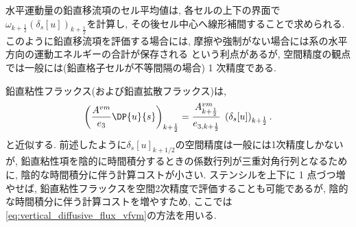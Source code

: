 水平運動量の鉛直移流項のセル平均値は, 各セルの上下の界面で 
$\omega_{k+\frac{1}{2}} (\delta_s[u])_{k+\frac{1}{2}}$を計算し,
その後セル中心へ線形補間することで求められる. このように鉛直移流項を評価する場合には, 
摩擦や強制がない場合には系の水平方向の運動エネルギーの合計が保存される\citep{arakawa1977computational}
という利点があるが, 空間精度の観点では一般には(鉛直格子セルが不等間隔の場合) 1 次精度である.

鉛直粘性フラックス(および鉛直拡散フラックス)は,   
\begin{equation*}
 \left(\dfrac{A^{vm}}{e_3} \DP{u}{s} \right)_{k+\frac{1}{2}}
  =\dfrac{A^{vm}_{k+\frac{1}{2}}}{e_{3,k+\frac{1}{2}}} 
    \; \left( \delta_s [u] \right)_{k+\frac{1}{2}}. 
 \label{eq:vertical_diffusive_flux_vfvm}
\end{equation*}
と近似する. 
前述したように$\delta_s[u]_{k+1/2}$の空間精度は一般には1次精度しかないが, 
鉛直粘性項を陰的に時間積分するときの係数行列が三重対角行列となるために, 陰的な時間積分に伴う計算コストが小さい. 
ステンシルを上下に 1 点づつ増やせば, 鉛直粘性フラックスを空間2次精度で評価することも可能であるが,  
陰的な時間積分に伴う計算コストを増やすため, ここでは\eqref{eq:vertical_diffusive_flux_vfvm}の方法を用いる. 
  
